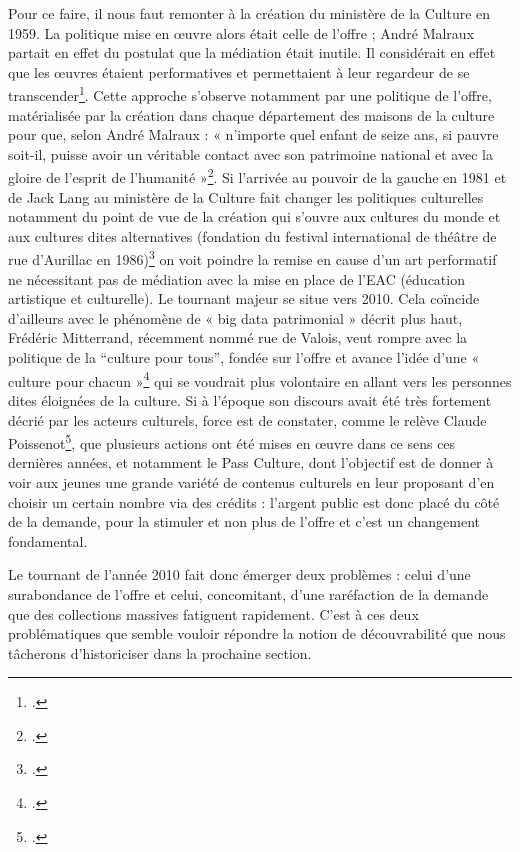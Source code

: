 Pour ce faire, il nous faut remonter à la création du ministère de la Culture en 1959. La politique mise en œuvre alors était celle de l’offre ; André Malraux partait en effet du postulat que la médiation était inutile. Il considérait en effet que les œuvres étaient performatives et permettaient à leur regardeur de se transcender\footcite[§3]{godin2011}. Cette approche s'observe notamment par une politique de l’offre, matérialisée par la création dans chaque département des maisons de la culture pour que, selon André Malraux : « n’importe quel enfant de seize ans, si pauvre soit-il, puisse avoir un véritable contact avec son patrimoine national et avec la gloire de l’esprit de l’humanité »\footcite[Entrée \enquote{(cité dans) maison de la culture}]{waresquiel2001}. Si l’arrivée au pouvoir de la gauche en 1981 et de Jack Lang au ministère de la Culture fait changer les politiques culturelles notamment du point de vue de la création qui s’ouvre aux cultures du monde et aux cultures dites alternatives (fondation du festival international de théâtre de rue d’Aurillac en 1986)\footcite{waresquiel2001} on voit poindre la remise en cause d’un art performatif ne nécessitant pas de médiation avec la mise en place de l’EAC (éducation artistique et culturelle). Le tournant majeur se situe vers 2010. Cela coïncide d’ailleurs avec le phénomène de « big data patrimonial » décrit plus haut, Frédéric Mitterrand, récemment nommé rue de Valois, veut rompre avec la politique de la \enquote{culture pour tous}, fondée sur l’offre et avance l’idée d’une « culture pour chacun »\footcite{2010} qui se voudrait plus volontaire en allant vers les personnes dites éloignées de la culture. Si à l’époque son discours avait été très fortement décrié par les acteurs culturels, force est de constater, comme le relève Claude Poissenot\footcite{zotero-269}, que plusieurs actions ont été mises en œuvre dans ce sens ces dernières années, et notamment le Pass Culture, dont l’objectif est de donner à voir aux jeunes une grande variété de contenus culturels en leur proposant d’en choisir un certain nombre via des crédits : l’argent public est donc placé du côté de la demande, pour la stimuler et non plus de l’offre et c’est un changement fondamental.

Le tournant de l’année 2010 fait donc émerger deux problèmes : celui d’une surabondance de l’offre et celui, concomitant, d’une raréfaction de la demande que des collections massives fatiguent rapidement. C’est à ces deux problématiques que semble vouloir répondre la notion de découvrabilité que nous tâcherons d’historiciser dans la prochaine section.


